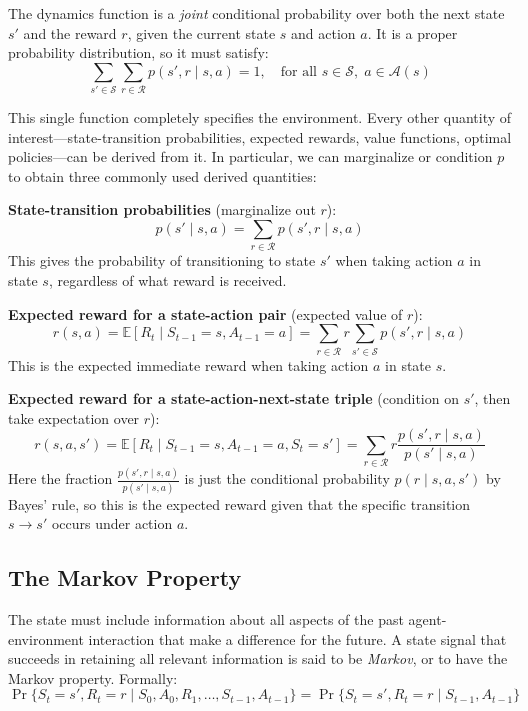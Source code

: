 \documentclass[12pt]{article}
\begin{document}
The dynamics function is a \textit{joint} conditional probability over both the next state $s'$ and the reward $r$, given the current state $s$ and action $a$. It is a proper probability distribution, so it must satisfy:
\begin{equation}
\sum_{s' \in \mathcal{S}} \sum_{r \in \mathcal{R}} p(s', r \mid s, a) = 1, \quad \text{for all } s \in \mathcal{S}, \; a \in \mathcal{A}(s)
\end{equation}

This single function completely specifies the environment. Every other quantity of interest---state-transition probabilities, expected rewards, value functions, optimal policies---can be derived from it. In particular, we can marginalize or condition $p$ to obtain three commonly used derived quantities:

\textbf{State-transition probabilities} (marginalize out $r$):
\begin{equation}
p(s' \mid s, a) = \sum_{r \in \mathcal{R}} p(s', r \mid s, a)
\end{equation}
This gives the probability of transitioning to state $s'$ when taking action $a$ in state $s$, regardless of what reward is received.

\textbf{Expected reward for a state-action pair} (expected value of $r$):
\begin{equation}
r(s, a) = \mathbb{E}[R_t \mid S_{t-1} = s, A_{t-1} = a] = \sum_{r \in \mathcal{R}} r \sum_{s' \in \mathcal{S}} p(s', r \mid s, a)
\end{equation}
This is the expected immediate reward when taking action $a$ in state $s$.

\textbf{Expected reward for a state-action-next-state triple} (condition on $s'$, then take expectation over $r$):
\begin{equation}
r(s, a, s') = \mathbb{E}[R_t \mid S_{t-1} = s, A_{t-1} = a, S_t = s'] = \sum_{r \in \mathcal{R}} r \frac{p(s', r \mid s, a)}{p(s' \mid s, a)}
\end{equation}
Here the fraction $\frac{p(s', r \mid s, a)}{p(s' \mid s, a)}$ is just the conditional probability $p(r \mid s, a, s')$ by Bayes' rule, so this is the expected reward given that the specific transition $s \to s'$ occurs under action $a$.

\subsection{The Markov Property}

The state must include information about all aspects of the past agent-environment interaction that make a difference for the future. A state signal that succeeds in retaining all relevant information is said to be \textit{Markov}, or to have the Markov property. Formally:
\begin{equation}
\Pr\{S_t = s', R_t = r \mid S_0, A_0, R_1, \ldots, S_{t-1}, A_{t-1}\} = \Pr\{S_t = s', R_t = r \mid S_{t-1}, A_{t-1}\}
\end{equation}
\end{document}
